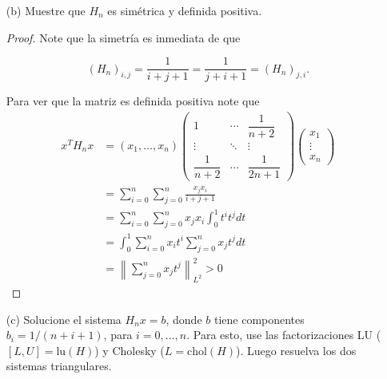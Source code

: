 \begin{enumerate}
\begin{proof}
    $$\sum_{j=0}^{n} a_j(H_n)_{k,j}=(H_n)_k\begin{pmatrix}
           a_{1} \\
           a_{2} \\
           \vdots \\
           a_{n}
         \end{pmatrix}=\int_0^1f(t)t^kdt=b_k,$$

donde $(H_n)_k$ denota la $k-$ésima fila de la matriz $(H_n)$, que es lo mismo que $H_n a=b$.


    \end{proof}

    \item[(b)] Muestre que $H_n$ es simétrica y definida positiva.\\

    \begin{proof}
    Note que la simetría es inmediata de  que

    $$(H_n)_{i,j}=\frac{1}{i+j+1}=\frac{1}{j+i+1}=(H_n)_{j,i}.$$

    Para ver que la matriz es definida positiva note que
    $$
\begin{aligned}
x^T H_n x & =\left(x_1, \ldots, x_n\right)\left(\begin{array}{ccc}
1 & \cdots & \dfrac{1}{n+2} \\
\vdots & \ddots & \vdots \\
\dfrac{1}{n+2} & \cdots & \dfrac{1}{2 n+1}
\end{array}\right)\left(\begin{array}{c}
x_1 \\
\vdots \\
x_n
\end{array}\right) \\
& =\sum_{i=0}^n \sum_{j=0}^n \frac{x_j x_i}{i+j+1} \\
& =\sum_{i=0}^n \sum_{j=0}^n x_j x_i \int_0^1 t^i t^j d t \\
& =\int_0^1 \sum_{i=0}^n x_i t^i \sum_{j=0}^n x_j t^j d t \\
& =\left\|\sum_{j=0}^{n} x_jt^j\right\|_{L^2}^2>0
\end{aligned}
$$
    \end{proof}

    \item[(c)] Solucione el sistema $H_n x = b$, donde $b$ tiene componentes $b_i = 1 / (n + i +1)$, para $i = 0, \ldots, n$. Para esto, use las factorizaciones LU ($[L, U] = \text{lu}(H)$) y Cholesky ($L = \text{chol}(H)$). Luego resuelva los dos sistemas triangulares.


\end{enumerate}
